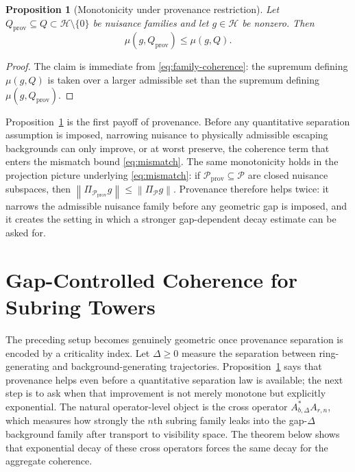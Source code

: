 \documentclass[11pt,a4paper]{article}
\newtheorem{proposition}{Proposition}
\theoremstyle{definition}
\theoremstyle{remark}
\newcommand{\norm}[1]{\left\lVert #1 \right\rVert}
\begin{document}
\begin{proposition}[Monotonicity under provenance restriction]
\label{prop:prov-monotone}
Let $Q_{\mathrm{prov}}\subseteq Q\subset \mathcal H \setminus \{0\}$ be nuisance families and let $g\in\mathcal H$ be nonzero. Then
\begin{equation}
\mu(g,Q_{\mathrm{prov}})
\le
\mu(g,Q).
\label{eq:prov-monotone}
\end{equation}
\end{proposition}

\begin{proof}
The claim is immediate from \eqref{eq:family-coherence}: the supremum defining $\mu(g,Q)$ is taken over a larger admissible set than the supremum defining $\mu(g,Q_{\mathrm{prov}})$.
\end{proof}

Proposition~\ref{prop:prov-monotone} is the first payoff of provenance. Before any quantitative separation assumption is imposed, narrowing nuisance to physically admissible escaping backgrounds can only improve, or at worst preserve, the coherence term that enters the mismatch bound \eqref{eq:mismatch}. The same monotonicity holds in the projection picture underlying \eqref{eq:mismatch}: if $\mathcal P_{\mathrm{prov}}\subseteq\mathcal P$ are closed nuisance subspaces, then $\norm{\Pi_{\mathcal P_{\mathrm{prov}}}g}\le \norm{\Pi_{\mathcal P}g}$. Provenance therefore helps twice: it narrows the admissible nuisance family before any geometric gap is imposed, and it creates the setting in which a stronger gap-dependent decay estimate can be asked for.

\section{Gap-Controlled Coherence for Subring Towers}
\label{sec:gap}

The preceding setup becomes genuinely geometric once provenance separation is encoded by a criticality index. Let $\Delta \ge 0$ measure the separation between ring-generating and background-generating trajectories. Proposition~\ref{prop:prov-monotone} says that provenance helps even before a quantitative separation law is available; the next step is to ask when that improvement is not merely monotone but explicitly exponential. The natural operator-level object is the cross operator $A_{b,\Delta}^{*}A_{r,n}$, which measures how strongly the $n$th subring family leaks into the gap-$\Delta$ background family after transport to visibility space. The theorem below shows that exponential decay of these cross operators forces the same decay for the aggregate coherence.
\end{document}
